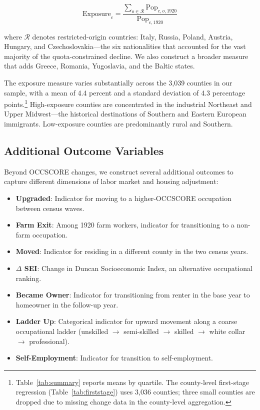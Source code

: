 \documentclass[12pt]{article}
\begin{document}
\begin{equation}
\text{Exposure}_c = \frac{\sum_{o \in \mathcal{R}} \text{Pop}_{c,o,1920}}{\text{Pop}_{c,1920}}
\label{eq:exposure}
\end{equation}

\noindent where $\mathcal{R}$ denotes restricted-origin countries: Italy, Russia, Poland, Austria, Hungary, and Czechoslovakia---the six nationalities that accounted for the vast majority of the quota-constrained decline. We also construct a broader measure that adds Greece, Romania, Yugoslavia, and the Baltic states.

The exposure measure varies substantially across the 3,039 counties in our sample, with a mean of 4.4 percent and a standard deviation of 4.3 percentage points.\footnote{Table~\ref{tab:summary} reports means by quartile. The county-level first-stage regression (Table~\ref{tab:firststage}) uses 3,036 counties; three small counties are dropped due to missing change data in the county-level aggregation.} High-exposure counties are concentrated in the industrial Northeast and Upper Midwest---the historical destinations of Southern and Eastern European immigrants. Low-exposure counties are predominantly rural and Southern.

\subsection{Additional Outcome Variables}

Beyond OCCSCORE changes, we construct several additional outcomes to capture different dimensions of labor market and housing adjustment:

\begin{itemize}
    \item \textbf{Upgraded}: Indicator for moving to a higher-OCCSCORE occupation between census waves.
    \item \textbf{Farm Exit}: Among 1920 farm workers, indicator for transitioning to a non-farm occupation.
    \item \textbf{Moved}: Indicator for residing in a different county in the two census years.
    \item \textbf{$\Delta$ SEI}: Change in Duncan Socioeconomic Index, an alternative occupational ranking.
    \item \textbf{Became Owner}: Indicator for transitioning from renter in the base year to homeowner in the follow-up year.
    \item \textbf{Ladder Up}: Categorical indicator for upward movement along a coarse occupational ladder (unskilled $\rightarrow$ semi-skilled $\rightarrow$ skilled $\rightarrow$ white collar $\rightarrow$ professional).
    \item \textbf{Self-Employment}: Indicator for transition to self-employment.
\end{itemize}
\end{document}
